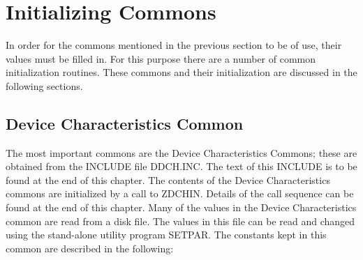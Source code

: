 \section{Initializing Commons}
 In order for the commons mentioned in the previous section to be of
use, their values must be filled in.  For this purpose there are a
number of common initialization routines. These commons and their
initialization are discussed in the following sections.


\subsection{Device Characteristics Common}
 The most important commons are the Device Characteristics Commons;
these are obtained from the INCLUDE file DDCH.INC.  The text of this
INCLUDE is to be found at the end of this chapter.  The contents of
the Device Characteristics commons are initialized by a call to
ZDCHIN.  Details of the call sequence can be found at the end of this
chapter.  Many of the values in the Device Characteristics common are
read from a disk file. The values in this file can be read and changed
using the stand-alone utility program SETPAR.  The constants kept in
this common are described in the following:
